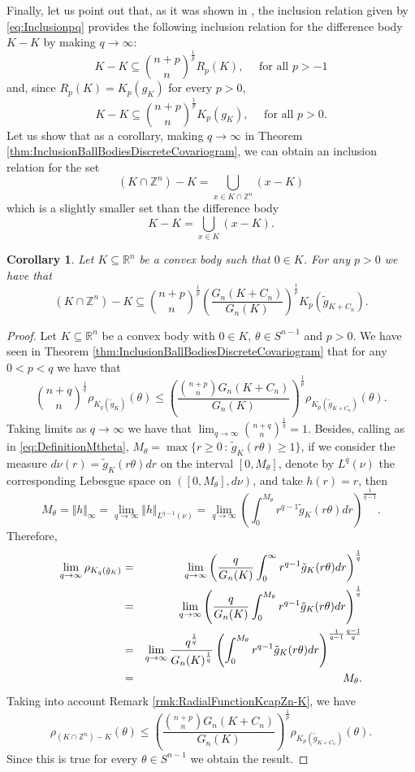 \documentclass[10pt]{amsart}
\newtheorem{cor}[thm]{Corollary}
\def\R{\mathbb{R}}
\def\Z{\mathbb{Z}}
\numberwithin{equation}{section}
\begin{document}
Finally, let us point out that, as it was shown in \cite{GZ}, the inclusion relation given by \eqref{eq:Inclusionpq} provides the following inclusion relation for the difference body $K-K$ by making $q\to\infty$:
$$
K-K\subseteq{{n+p}\choose{n}}^\frac{1}{p}R_p(K),\quad\textrm{ for all } p>-1
$$
and, since $R_p(K)=K_p(g_K)$ for every $p>0$,
$$
K-K\subseteq{{n+p}\choose{n}}^\frac{1}{p}K_p(g_K),\quad\textrm{ for all } p>0.
$$
Let us show that as a corollary, making $q\to\infty$ in Theorem \ref{thm:InclusionBallBodiesDiscreteCovariogram}, we can obtain an inclusion relation for the set
$$
(K\cap\Z^n)-K=\bigcup_{x\in K\cap\Z^n}(x-K)
$$
which is a slightly smaller set than the difference body
$$
K-K=\bigcup_{x\in K}(x-K).
$$
\begin{cor}\label{cor:DifferenceBody}
Let $K\subseteq\R^n$ be a convex body such that $0\in K$. For any $p>0$ we have that
$$
(K\cap\Z^n)-K\subseteq {{n+p}\choose{n}}^\frac{1}{p}\left(\frac{G_n(K+C_n)}{G_n(K)}\right)^\frac{1}{p}K_p(\tilde{g}_{K+C_n}).
$$
\end{cor}
\begin{proof}
Let $K\subseteq\R^n$ be a convex body with $0\in K$, $\theta\in S^{n-1}$ and $p>0$. We have seen in Theorem \ref{thm:InclusionBallBodiesDiscreteCovariogram} that for any $0<p<q$ we have that
$$
{{n+q}\choose{n}}^\frac{1}{q}\rho_{K_q(\tilde{g}_K)}(\theta)\leq\left(\frac{{{n+p}\choose{n}}G_n(K+C_n)}{G_n(K)}\right)^\frac{1}{p}\rho_{K_p(\tilde{g}_{K+C_n})}(\theta).
$$
Taking limits as $q\to\infty$ we have that $\displaystyle{\lim_{q\to\infty}{{n+q}\choose{n}}^\frac{1}{q}=1}$. Besides, calling as in \eqref{eq:DefinitionMtheta}, $M_\theta=\max\{r\geq0\,:\, \tilde{g}_{K}(r\theta)\geq 1\}$, if we consider the measure $d\nu(r)=\tilde{g}_K(r\theta)dr$ on the interval $[0,M_\theta]$, denote by $L^q(\nu)$ the corresponding Lebesgue space on $([0,M_\theta],d \nu)$, and take $h(r)=r$, then
$$
M_\theta=\Vert h\Vert_\infty=\lim_{q\to\infty}\Vert h\Vert_{L^{q-1}(\nu)}=\lim_{q\to\infty}\left(\int_0^{M_\theta}r^{q-1}\tilde{g}_K(r\theta)dr\right)^\frac{1}{q-1}.
$$
Therefore,
\begin{eqnarray*}
\lim_{q\to\infty}\rho_{K_q(\tilde{g}_K)}&=&\lim_{q\to\infty}\left(\frac{q}{G_n(K)}\int_0^{\infty}r^{q-1}\tilde{g}_K(r\theta)dr\right)^\frac{1}{q}\cr
&=&\lim_{q\to\infty}\left(\frac{q}{G_n(K)}\int_0^{M_\theta}r^{q-1}\tilde{g}_K(r\theta)dr\right)^\frac{1}{q}\cr
&=&\lim_{q\to\infty}\frac{q^\frac{1}{q}}{G_n(K)^\frac{1}{q}}\left(\int_0^{M_\theta}r^{q-1}\tilde{g}_K(r\theta)dr\right)^{\frac{1}{q-1}\frac{q-1}{q}}\cr
&=&M_\theta.
\end{eqnarray*}
Taking into account Remark \ref{rmk:RadialFunctionKcapZn-K}, we have
$$
\rho_{(K\cap \Z^n)-K}(\theta)\leq\left(\frac{{{n+p}\choose{n}}G_n(K+C_n)}{G_n(K)}\right)^\frac{1}{p}\rho_{K_p(\tilde{g}_{K+C_n})}(\theta).
$$
Since this is true for every $\theta\in S^{n-1}$ we obtain the result.
\end{proof}
\end{document}
